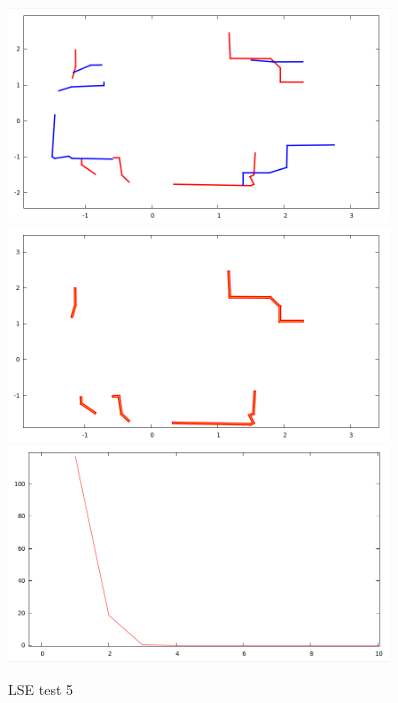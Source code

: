 \documentclass[a4paper, onecolumn]{report}
\begin{document}
\begin{figure}[htbp]
\centering
\includegraphics[width=0.9\textwidth]{images/foto_test/0.5_-0.3_-4.7124/before_after.png}
\includegraphics[width=0.9\textwidth]{images/foto_test/0.5_-0.3_-4.7124/result.png}
\includegraphics[width=0.9\textwidth]{images/foto_test/0.5_-0.3_-4.7124/chi_new.png}
\caption{LSE test 5}
\end{figure}
\end{document}
